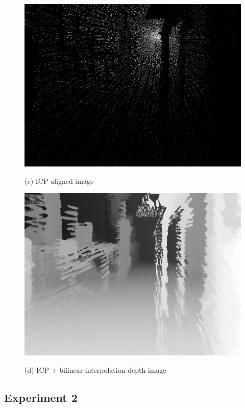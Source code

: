 \documentclass[english, bachelor, utf8]{base/thesis_telematics}
\begin{document}
\begin{figure}[H]
  \centering
  \begin{minipage}{0.48\textwidth}
    \centering
    \includegraphics[width=\linewidth]{pics/KUKA_Lab_Depth.png}
    \caption*{(c) ICP aligned image}
  \end{minipage}\hfill
  \begin{minipage}{0.48\textwidth}
    \centering
    \includegraphics[width=\linewidth]{pics/KUKA_filled.png}
    \caption*{(d) ICP + bilinear interpolation depth image}
  \end{minipage}
  \caption{}
  \label{fig:interp_completed}
\end{figure}

\subsection{Experiment 2}
\end{document}
